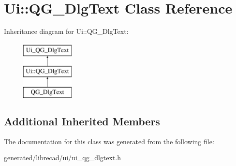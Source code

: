\hypertarget{classUi_1_1QG__DlgText}{\section{Ui\-:\-:Q\-G\-\_\-\-Dlg\-Text Class Reference}
\label{classUi_1_1QG__DlgText}
}
Inheritance diagram for Ui\-:\-:Q\-G\-\_\-\-Dlg\-Text\-:\begin{figure}[H]
\begin{center}
\leavevmode
\includegraphics[height=3.000000cm]{classUi_1_1QG__DlgText}
\end{center}
\end{figure}
\subsection*{Additional Inherited Members}


The documentation for this class was generated from the following file\-:\begin{DoxyCompactItemize}
\item 
generated/librecad/ui/ui\-\_\-qg\-\_\-dlgtext.\-h\end{DoxyCompactItemize}
